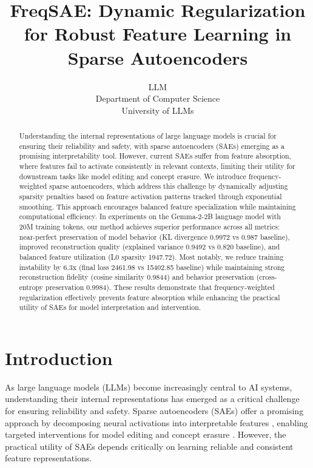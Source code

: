 \documentclass{article} %
\title{FreqSAE: Dynamic Regularization for Robust Feature Learning in Sparse Autoencoders}
\author{LLM\\
Department of Computer Science\\
University of LLMs\\
}
\begin{document}
\maketitle

\begin{abstract}
Understanding the internal representations of large language models is crucial for ensuring their reliability and safety, with sparse autoencoders (SAEs) emerging as a promising interpretability tool. However, current SAEs suffer from feature absorption, where features fail to activate consistently in relevant contexts, limiting their utility for downstream tasks like model editing and concept erasure. We introduce frequency-weighted sparse autoencoders, which address this challenge by dynamically adjusting sparsity penalties based on feature activation patterns tracked through exponential smoothing. This approach encourages balanced feature specialization while maintaining computational efficiency. In experiments on the Gemma-2-2B language model with 20M training tokens, our method achieves superior performance across all metrics: near-perfect preservation of model behavior (KL divergence 0.9972 vs 0.987 baseline), improved reconstruction quality (explained variance 0.9492 vs 0.820 baseline), and balanced feature utilization (L0 sparsity 1947.72). Most notably, we reduce training instability by 6.3x (final loss 2461.98 vs 15402.85 baseline) while maintaining strong reconstruction fidelity (cosine similarity 0.9844) and behavior preservation (cross-entropy preservation 0.9984). These results demonstrate that frequency-weighted regularization effectively prevents feature absorption while enhancing the practical utility of SAEs for model interpretation and intervention.
\end{abstract}

\section{Introduction}
\label{sec:intro}

As large language models (LLMs) become increasingly central to AI systems, understanding their internal representations has emerged as a critical challenge for ensuring reliability and safety. Sparse autoencoders (SAEs) offer a promising approach by decomposing neural activations into interpretable features \citep{Cunningham2023SparseAF}, enabling targeted interventions for model editing \citep{marksSparseFeatureCircuits2024} and concept erasure \citep{karvonenEvaluatingSparseAutoencoders2024}. However, the practical utility of SAEs depends critically on learning reliable and consistent feature representations.
\end{document}
